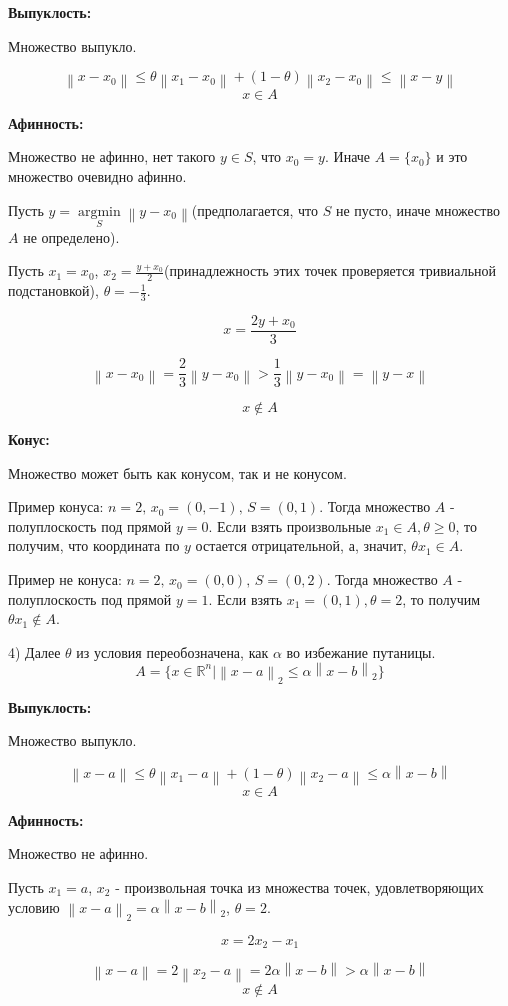 \documentclass[12pt]{article}
\DeclareMathOperator*{\argmin}{argmin}
\newcommand\norm[1]{\left\lVert#1\right\rVert}
\begin{document}
\textbf{Выпуклость:}

Множество выпукло.

$$\norm{x-x_0}\leq \theta\norm{x_1-x_0}+(1-\theta)\norm{x_2-x_0}\leq \norm{x-y}$$
$$x\in A$$

\textbf{Афинность:}

Множество не афинно, нет такого $y \in S$, что $x_0=y$. Иначе $A=\{x_0\}$ и это множество очевидно афинно.

Пусть $y =\argmin\limits_S\norm{y-x_0}$(предполагается, что $S$ не пусто, иначе множество $A$ не определено).

Пусть $x_1 = x_0$, $x_2 = \frac{y+x_0}{2}$(принадлежность этих точек проверяется тривиальной подстановкой), $\theta = -\frac{1}{3}$.

$$x=\frac{2y+x_0}{3}$$

$$\norm{x-x_0} = \frac{2}{3}\norm{y - x_0}> \frac{1}{3}\norm{y - x_0} = \norm{y-x}$$

$$x\notin A$$

\textbf{Конус:}

Множество может быть как конусом, так и не конусом.

Пример конуса: $n=2,\,x_0=(0,-1), \,S = {(0,1)}$. Тогда множество $A$ - полуплоскость под прямой $y=0$. Если взять произвольные $x_1 \in A, \theta\geq 0$, то получим, что координата по $y$ остается отрицательной, а, значит, $\theta x_1 \in A$.

Пример не конуса: $n=2,\,x_0=(0,0), \,S = {(0,2)}$. Тогда множество $A$ - полуплоскость под прямой $y=1$. Если взять $x_1=(0,1),\theta=2$, то получим $\theta x_1\notin A$.

4) Далее $\theta$ из условия переобозначена, как $\alpha$ во избежание путаницы. $$A=\{x\in\mathbb{R}^n|\norm{x-a}_2\leq \alpha\norm{x-b}_2\}$$

\textbf{Выпуклость:}

Множество выпукло.

$$\norm{x-a}\leq \theta\norm{x_1-a}+(1-\theta)\norm{x_2-a}\leq \alpha\norm{x-b}$$
$$x\in A$$

\textbf{Афинность:}

Множество не афинно.

Пусть $x_1 = a$, $x_2$ - произвольная точка из множества точек, удовлетворяющих условию $\norm{x-a}_2= \alpha\norm{x-b}_2$, $\theta = 2$.

$$x= 2x_2-x_1$$

$$\norm{x-a} = 2\norm{x_2 -a} = 2\alpha\norm{x-b}>\alpha\norm{x-b}$$
$$x\notin A$$
\end{document}
